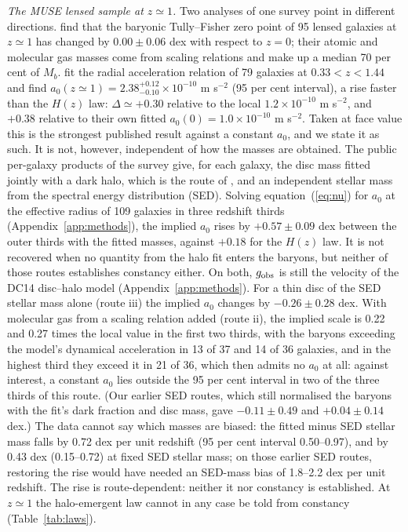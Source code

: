 \documentclass[fleqn,usenatbib]{mnras}
\begin{document}
\emph{The MUSE lensed sample at $z\simeq1$.} Two analyses of one survey point in different directions. \citet{Jeanneau2026} find that the baryonic Tully--Fisher zero point of 95 lensed galaxies at $z\simeq1$ has changed by $0.00\pm0.06$ dex with respect to $z=0$; their atomic and molecular gas masses come from scaling relations and make up a median 70 per cent of $M_b$. \citet{Ciocan2026} fit the radial acceleration relation of 79 galaxies at $0.33<z<1.44$ and find $a_0(z\simeq1)=2.38^{+0.12}_{-0.10}\times10^{-10}$ m s$^{-2}$ (95 per cent interval), a rise faster than the $H(z)$ law: $\Delta\simeq+0.30$ relative to the local $1.2\times10^{-10}$ m s$^{-2}$, and $+0.38$ relative to their own fitted $a_0(0)=1.0\times10^{-10}$ m s$^{-2}$. Taken at face value this is the strongest published result against a constant $a_0$, and we state it as such. It is not, however, independent of how the masses are obtained. The public per-galaxy products of the survey give, for each galaxy, the disc mass fitted jointly with a dark halo, which is the route of \citet{Ciocan2026}, and an independent stellar mass from the spectral energy distribution (SED). Solving equation~(\ref{eq:nu}) for $a_0$ at the effective radius of 109 galaxies in three redshift thirds (Appendix~\ref{app:methods}), the implied $a_0$ rises by $+0.57\pm0.09$ dex between the outer thirds with the fitted masses, against $+0.18$ for the $H(z)$ law. It is not recovered when no quantity from the halo fit enters the baryons, but neither of those routes establishes constancy either. On both, $g_{\rm obs}$ is still the velocity of the DC14 disc--halo model (Appendix~\ref{app:methods}). For a thin disc of the SED stellar mass alone (route iii) the implied $a_0$ changes by $-0.26\pm0.28$ dex. With molecular gas from a scaling relation added (route ii), the implied scale is 0.22 and 0.27 times the local value in the first two thirds, with the baryons exceeding the model's dynamical acceleration in 13 of 37 and 14 of 36 galaxies, and in the highest third they exceed it in 21 of 36, which then admits no $a_0$ at all: against interest, a constant $a_0$ lies outside the 95 per cent interval in two of the three thirds of this route. (Our earlier SED routes, which still normalised the baryons with the fit's dark fraction and disc mass, gave $-0.11\pm0.49$ and $+0.04\pm0.14$ dex.) The data cannot say which masses are biased: the fitted minus SED stellar mass falls by 0.72 dex per unit redshift (95 per cent interval 0.50--0.97), and by 0.43 dex (0.15--0.72) at fixed SED stellar mass; on those earlier SED routes, restoring the rise would have needed an SED-mass bias of 1.8--2.2 dex per unit redshift. The rise is route-dependent: neither it nor constancy is established. At $z\simeq1$ the halo-emergent law cannot in any case be told from constancy (Table~\ref{tab:laws}).
\end{document}
